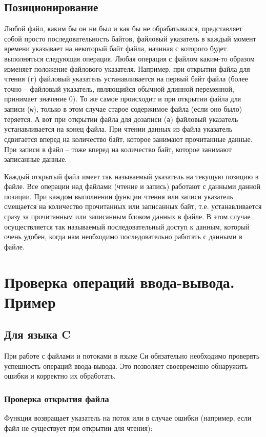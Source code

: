\subsection{Позиционирование}
Любой файл, каким бы он ни был и как бы не обрабатывался, представляет собой просто последовательность байтов, файловый
указатель в каждый момент времени указывает на некоторый байт файла, начиная с которого будет выполняться следующая
операция. Любая операция с файлом каким-то образом изменяет положение файлового указателя. Например, при открытии файла
для чтения (\verb|r|) файловый указатель устанавливается на первый байт файла (более точно – файловый указатель, являющийся
обычной длинной переменной, принимает значение 0). То же самое происходит и при открытии файла для записи (\verb|w|), только
в этом случае старое содержимое файла (если оно было) теряется. А вот при открытии файла для дозаписи (\verb|a|) файловый
указатель устанавливается на конец файла. При чтении данных из файла указатель сдвигается вперед на количество байт, которое
занимают прочитанные данные. При записи в файл – тоже вперед на количество байт, которое занимают записанные данные.

Каждый открытый файл имеет так называемый указатель на текущую позицию в файле. Все операции над файлами (чтение и запись)
работают с данными данной позиции. При каждом выполнении функции чтения или записи указатель смещается на количество прочитанных
или записанных байт, т.е. устанавливается сразу за прочитанным или записанным блоком данных в файле. В этом случае осуществляется
так называемый последовательный доступ к данным, который очень удобен, когда нам необходимо последовательно работать с данными в файле.


\section{Проверка операций ввода-вывода. Пример}
\subsection{Для языка C}
При работе с файлами и потоками в языке Си обязательно необходимо проверять успешность операций ввода-вывода. Это позволяет своевременно
обнаружить ошибки и корректно их обработать.

\subsubsection{Проверка открытия файла}
Функция  возвращает указатель на поток или  в случае ошибки (например, если файл не существует при открытии для чтения):

